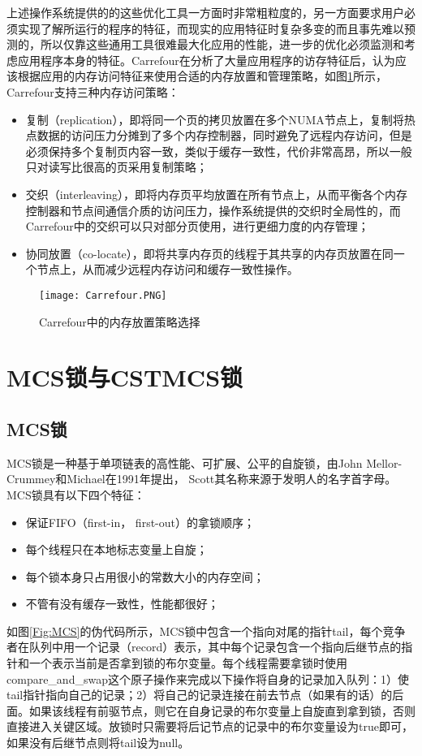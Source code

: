 上述操作系统提供的的这些优化工具一方面时非常粗粒度的，另一方面要求用户必须实现了解所运行的程序的特征，而现实的应用特征时复杂多变的而且事先难以预测的，所以仅靠这些通用工具很难最大化应用的性能，进一步的优化必须监测和考虑应用程序本身的特征。Carrefour\cite{dashti2013traffic}在分析了大量应用程序的访存特征后，认为应该根据应用的内存访问特征来使用合适的内存放置和管理策略，如图\ref{Fig:carrefour}所示，Carrefour支持三种内存访问策略：
\begin{itemize}
\item  复制（replication），即将同一个页的拷贝放置在多个NUMA节点上，复制将热点数据的访问压力分摊到了多个内存控制器，同时避免了远程内存访问，但是必须保持多个复制页内容一致，类似于缓存一致性，代价非常高昂，所以一般只对读写比很高的页采用复制策略；
\item  交织（interleaving），即将内存页平均放置在所有节点上，从而平衡各个内存控制器和节点间通信介质的访问压力，操作系统提供的交织时全局性的，而Carrefour中的交织可以只对部分页使用，进行更细力度的内存管理；
\item 协同放置（co-locate），即将共享内存页的线程于其共享的内存页放置在同一个节点上，从而减少远程内存访问和缓存一致性操作。
\end{itemize}

\begin{figure}[t]
	\centering
	\texttt{[image: Carrefour.PNG]}
	\caption{Carrefour中的内存放置策略选择}
	\label{Fig:carrefour}
\end{figure}

\section{MCS锁与CSTMCS锁}
\subsection{MCS锁}
MCS锁是一种基于单项链表的高性能、可扩展、公平的自旋锁，由John Mellor-Crummey和Michael在1991年提出， Scott其名称来源于发明人的名字首字母。MCS锁具有以下四个特征：
\begin{itemize}
\item  保证FIFO（first-in， first-out）的拿锁顺序；
\item  每个线程只在本地标志变量上自旋；
\item  每个锁本身只占用很小的常数大小的内存空间；
\item  不管有没有缓存一致性，性能都很好；
\end{itemize}

如图\ref{Fig:MCS}的伪代码所示，MCS锁中包含一个指向对尾的指针tail，每个竞争者在队列中用一个记录（record）表示，其中每个记录包含一个指向后继节点的指针和一个表示当前是否拿到锁的布尔变量。每个线程需要拿锁时使用compare\_and\_swap这个原子操作来完成以下操作将自身的记录加入队列：1）使tail指针指向自己的记录；2）将自己的记录连接在前去节点（如果有的话）的后面。如果该线程有前驱节点，则它在自身记录的布尔变量上自旋直到拿到锁，否则直接进入关键区域。放锁时只需要将后记节点的记录中的布尔变量设为true即可，如果没有后继节点则将tail设为null。

